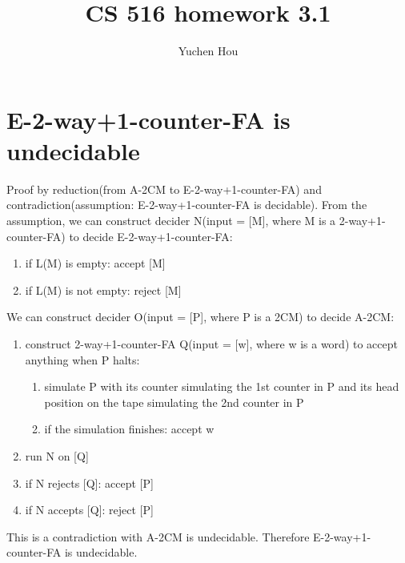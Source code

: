 \documentclass{article}
\begin{document}
\lstset{language=python, tabsize=4}
\title{CS 516 homework 3.1}
\author{Yuchen Hou}
\maketitle

\section{E-2-way+1-counter-FA is undecidable}
Proof by reduction(from A-2CM to E-2-way+1-counter-FA) and contradiction(assumption: E-2-way+1-counter-FA is decidable). From the assumption, we can construct decider N(input = [M], where M is a 2-way+1-counter-FA) to decide E-2-way+1-counter-FA:
\begin{enumerate}
	\item if L(M) is empty: accept [M]
	\item if L(M) is not empty: reject [M]
\end{enumerate}
We can construct decider O(input = [P], where P is a 2CM) to decide A-2CM:
\begin{enumerate}
	\item construct 2-way+1-counter-FA Q(input = [w], where w is a word) to accept anything when P halts:
	\begin{enumerate}
		\item simulate P with its counter simulating the 1st counter in P and its head position on the tape simulating the 2nd counter in P
		\item if the simulation finishes: accept w
	\end{enumerate}
	\item run N on [Q]
	\item if N rejects [Q]: accept [P]
	\item if N accepts [Q]: reject [P]
\end{enumerate}
This is a contradiction with A-2CM is undecidable. Therefore E-2-way+1-counter-FA is undecidable.
\end{document}
